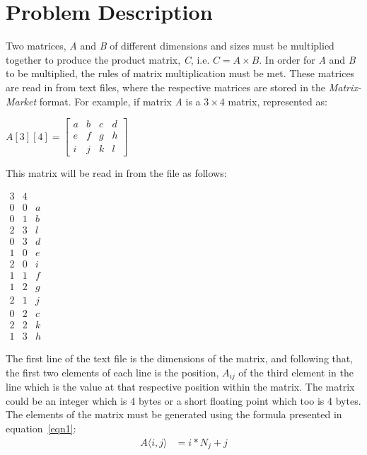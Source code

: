 \documentclass[10pt, conference]{IEEEtran}
\begin{document}
\section{Problem Description}
\label{Problem Description}
Two matrices, \emph{A} and \emph{B} of different dimensions and sizes must be multiplied together to produce the product matrix, \emph{C}, i.e. $C = A \times B$. In order for \emph{A} and \emph{B} to be multiplied, the rules of matrix multiplication must be met. These matrices are read in from text files, where the respective matrices are stored in the \emph{Matrix-Market} format. For example, if matrix \emph{A} is a $3\times4$ matrix, represented as:\\
\begin{center}
$A[3][4] = 
\begin{bmatrix}
a & b & c & d\\ 
e & f & g & h\\ 
i & j & k & l
\end{bmatrix}
$
\end{center}
This matrix will be read in from the file as follows:

\begin{center}
$
\begin{matrix}
3 & 4 & \\ 
0 & 0 & a\\ 
0 & 1 & b\\ 
2 & 3 & l\\ 
0 & 3 & d\\ 
1 & 0 & e\\ 
2 & 0 & i\\ 
1 & 1 & f\\ 
1 & 2 & g\\ 
2 & 1 & j\\ 
0 & 2 & c\\ 
2 & 2 & k\\ 
1 & 3 & h
\end{matrix}
$
\end{center}
The first line of the text file is the dimensions of the matrix, and following that, the first two elements of each line is the position, $A_{ij}$ of the third element in the line which is the value at that respective position within the matrix. The matrix could be an integer which is 4 bytes or a short floating point which too is 4 bytes. The elements of the matrix must be generated using the formula presented in equation~\ref{eqn1}:
\begin{equation}
\label{eqn1}
\begin{split}
A\langle i, j\rangle & = i *N_j + j
\end{split}
\end{equation}
\end{document}
